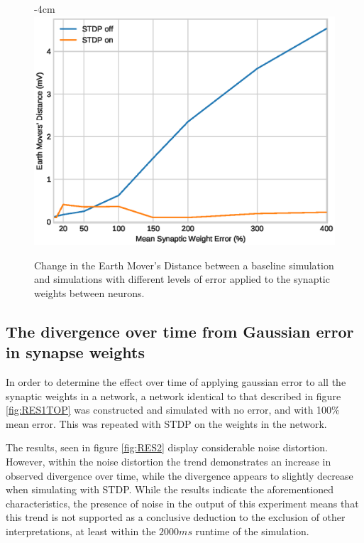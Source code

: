 \begin{figure}[h!]
    \centering
    \addtolength{\leftskip} {-4cm}
    \addtolength{\rightskip}{-4cm}
    \includegraphics[width=0.8\linewidth]{figures/graphs/RESULT1.eps}
    \caption[Increase in EMD from inserting error in network synaptic weights]{Change in the Earth Mover's Distance between a baseline simulation and simulations with different levels of error applied to the synaptic weights between neurons.}
    \label{fig:RES1}
\end{figure}
\FloatBarrier


\subsection{The divergence over time from Gaussian error in synapse weights}

In order to determine the effect over time of applying gaussian error to all the
synaptic weights in a network, a network identical to that described in figure
\ref{fig:RES1TOP} was constructed and simulated with no error, and with 100\%
mean error. This was repeated with STDP on the weights in the network. 

The results, seen in figure \ref{fig:RES2} display considerable noise
distortion. However, within the noise distortion the trend demonstrates an
increase in observed divergence over time, while the divergence appears to
slightly decrease when simulating with STDP. While the results indicate the
aforementioned characteristics, the presence of noise in the output of this
experiment means that this trend is not supported as a conclusive deduction to
the exclusion of other interpretations, at least within the $2000ms$ runtime of
the simulation.

